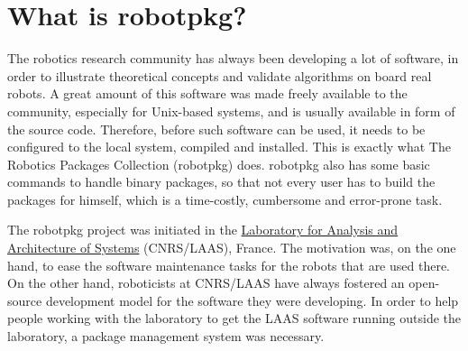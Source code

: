 %
%
%
%
%

\section{What is robotpkg?} %

The robotics research  community has always been developing  a lot of software,
in order  to illustrate theoretical concepts and  validate algorithms  on board
real robots.  A great amount of this software was  made freely available to the
community, especially for Unix-based systems,  and is usually available in form
of the source code. Therefore, before such software can be used, it needs to be
configured to  the local system, compiled and  installed.  This is exactly what
The Robotics Packages Collection (robotpkg) does.  robotpkg also has some basic
commands  to handle binary packages,  so that not  every user  has to build the
packages for himself, which is a time-costly, cumbersome and error-prone task.

The robotpkg project was initiated in the \href{http://www.laas.fr/}{Laboratory
for Analysis and Architecture of  Systems} (CNRS/LAAS), France.  The motivation
was, on the one hand,  to ease the software   maintenance tasks for the  robots
that are used there.   On the other  hand, roboticists at CNRS/LAAS have always
fostered  an  open-source  development   model  for   the   software they  were
developing.  In order to  help people  working with the  laboratory to  get the
LAAS software  running outside the laboratory,  a package management system was
necessary.


